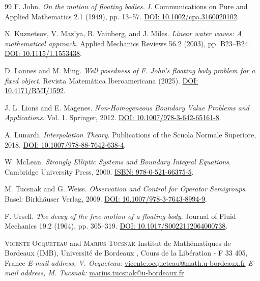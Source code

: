 \documentclass{amsart} %
\numberwithin{equation}{section}
\theoremstyle{definition}
\begin{document}
\begin{thebibliography}{99}
 F. John. \textit{On the motion of floating bodies. I}. Communications on Pure and Applied Mathematics 2.1 (1949), pp. 13--57. \href{https://doi.org/10.1002/cpa.3160020102}{\textcolor{black}{DOI: 10.1002/cpa.3160020102}}.

 N. Kuznetsov, V. Maz'ya, B. Vainberg, and J. Miles. \textit{Linear water waves: A mathematical approach}. Applied Mechanics Reviews 56.2 (2003), pp. B23--B24. \href{https://doi.org/10.1115/1.1553438}{\textcolor{black}{DOI: 10.1115/1.1553438}}.

 D. Lannes and M. Ming. \textit{Well posedness of F. John's floating body problem for a fixed object}. Revista Matem\'atica Iberoamericana (2025). \href{https://doi.org/10.4171/RMI/1592}{\textcolor{black}{DOI: 10.4171/RMI/1592}}.

 J. L. Lions and E. Magenes. \textit{Non-Homogeneous Boundary Value Problems and Applications}. Vol. 1. Springer, 2012. \href{https://doi.org/10.1007/978-3-642-65161-8}{\textcolor{black}{DOI: 10.1007/978-3-642-65161-8}}.

 A. Lunardi. \textit{Interpolation Theory}. Publications of the Scuola Normale Superiore, 2018. \href{https://doi.org/10.1007/978-88-7642-638-4}{\textcolor{black}{DOI: 10.1007/978-88-7642-638-4}}.

 W. McLean. \textit{Strongly Elliptic Systems and Boundary Integral Equations}. Cambridge University Press, 2000. \href{https://www.cambridge.org/de/universitypress/subjects/mathematics/differential-and-integral-equations-dynamical-systems-and-co/strongly-elliptic-systems-and-boundary-integral-equations}{\textcolor{black}{ISBN: 978-0-521-66375-5}}.

 M. Tucsnak and G. Weiss. \textit{Observation and Control for Operator Semigroups}. Basel: Birkh\"auser Verlag, 2009. \href{https://doi.org/10.1007/978-3-7643-8994-9}{\textcolor{black}{DOI: 10.1007/978-3-7643-8994-9}}.

 F. Ursell. \textit{The decay of the free motion of a floating body}. Journal of Fluid Mechanics 19.2 (1964), pp. 305--319. \href{https://doi.org/10.1017/S0022112064000738}{\textcolor{black}{DOI: 10.1017/S0022112064000738}}.

\end{thebibliography}
\vspace{1cm}
\noindent
\textsc{Vicente Ocqueteau} and \textsc{Marius Tucsnak} \newline
Institut de Math\'ematiques de Bordeaux (IMB), Universit\'e de Bordeaux , Cours de la Lib\'eration - F 33 405, France \newline
\textit{E-mail address, V. Ocqueteau:} \href{mailto:vicente.ocqueteau@math.u-bordeaux.fr}{vicente.ocqueteau@math.u-bordeaux.fr} \newline
\textit{E-mail address, M. Tucsnak:} \href{mailto:marius.tucsnak@u-bordeaux.fr}{marius.tucsnak@u-bordeaux.fr}
\end{document}
